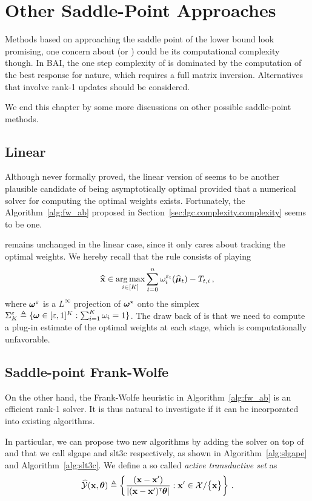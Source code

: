 \section{Other Saddle-Point Approaches}\label{sec:lgc.sp}

Methods based on approaching the saddle point of the lower bound look promising, one concern about \LG{} (or \LGC{}) could be its computational complexity though. In BAI, the one step complexity of \LG{} is dominated by the computation of the best response for nature, which requires a full matrix inversion. Alternatives that involve rank-1 updates should be considered.

We end this chapter by some more discussions on other possible saddle-point methods.

\subsection{Linear \texorpdfstring{\Track{}}{}}

Although never formally proved, the linear version of \Track seems to be another plausible candidate of being asymptotically optimal provided that a numerical solver for computing the optimal weights exists. Fortunately, the Algorithm~\ref{alg:fw_ab} proposed in Section~\ref{sec:lgc.complexity.complexity} seems to be one. 

\Track remains unchanged in the linear case, since it only cares about tracking the optimal weights. We hereby recall that the \CT rule consists of playing
\[
    \widehat{{\bf x}} \in \operatorname*{arg\,max}_{i\in[K]} \sum_{t=0}^n \omega_i^{\varepsilon_t}(\widehat{{\boldsymbol \mu}}_t)-T_{t,i}\,,
\]
where ${\boldsymbol \omega}^\varepsilon$ is a $L^\infty$ projection of ${\boldsymbol \omega}^\star$ onto the simplex $\Sigma_K^\varepsilon \triangleq \{{\boldsymbol \omega}\in [\varepsilon,1]^K : \sum_{i=1}^K \omega_i = 1\}$. The draw back of \Track is that we need to compute a plug-in estimate of the optimal weights at each stage, which is computationally unfavorable.

\subsection{Saddle-point Frank-Wolfe}
On the other hand, the Frank-Wolfe heuristic in Algorithm~\ref{alg:fw_ab} is an efficient rank-1 solver. It is thus natural to investigate if it can be incorporated into existing algorithms. 

In particular, we can propose two new algorithms by adding the solver on top of \LGapE{} and \LTCC that we call \gls{slgape} and \gls{slt3c} respectively, as shown in Algorithm~\ref{alg:slgape} and Algorithm~\ref{alg:slt3c}. We define a so called \emph{active transductive set} as
\begin{align}\label{def:active_transductive}
    \widehat{\mathcal{Y}}({\bf x},{\boldsymbol \theta}) \triangleq \left\{ \frac{({\bf x}- {\bf x}')}{\left|({\bf x}-{\bf x}')^\mathsf{\scriptscriptstyle T}{\boldsymbol \theta}\right|}: {\bf x}'\in\mathcal{X}/\big\{{\bf x}\big\}  \right\}\,.
\end{align}

